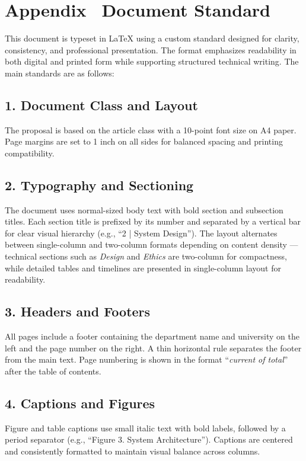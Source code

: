 \section*{Appendix \thesection \, \textbar \vspace{0.5em} Document Standard}
\label{sec:appendix-document-standard}

This document is typeset in LaTeX using a custom standard designed for clarity, consistency, and professional presentation. The format emphasizes readability in both digital and printed form while supporting structured technical writing. The main standards are as follows:
\subsection*{1. Document Class and Layout}
The proposal is based on the article class with a 10-point font size on A4 paper. Page margins are set to 1 inch on all sides for balanced spacing and printing compatibility.
\subsection*{2. Typography and Sectioning}
The document uses normal-sized body text with bold section and subsection titles. Each section title is prefixed by its number and separated by a vertical bar for clear visual hierarchy (e.g., “2 | System Design”).
The layout alternates between single-column and two-column formats depending on content density — technical sections such as \textit{Design} and \textit{Ethics} are two-column for compactness, while detailed tables and timelines are presented in single-column layout for readability.
\subsection*{3. Headers and Footers}
All pages include a footer containing the department name and university on the left and the page number on the right. A thin horizontal rule separates the footer from the main text. Page numbering is shown in the format “\textit{current of total}” after the table of contents.
\subsection*{4. Captions and Figures}
Figure and table captions use small italic text with bold labels, followed by a period separator (e.g., “Figure 3. System Architecture”). Captions are centered and consistently formatted to maintain visual balance across columns.

